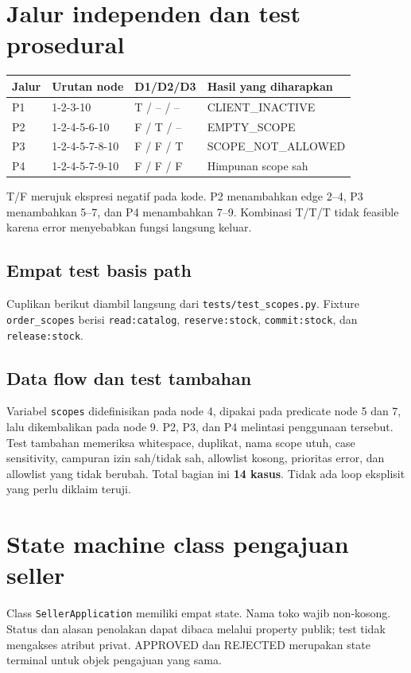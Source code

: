 \documentclass[11pt,a4paper]{article}
\begin{document}
\section{Jalur independen dan test prosedural}
\begin{tabularx}{\linewidth}{@{}l P{4cm} l Y@{}}
\toprule
Jalur & Urutan node & D1/D2/D3 & Hasil yang diharapkan\\\midrule
P1 & 1-2-3-10 & T / -- / -- & CLIENT\_INACTIVE\\
P2 & 1-2-4-5-6-10 & F / T / -- & EMPTY\_SCOPE\\
P3 & 1-2-4-5-7-8-10 & F / F / T & SCOPE\_NOT\_ALLOWED\\
P4 & 1-2-4-5-7-9-10 & F / F / F & Himpunan scope sah\\\bottomrule
\end{tabularx}

T/F merujuk ekspresi negatif pada kode. P2 menambahkan edge 2--4,
P3 menambahkan 5--7, dan P4 menambahkan 7--9. Kombinasi T/T/T tidak
feasible karena error menyebabkan fungsi langsung keluar.

\subsection{Empat test basis path}
Cuplikan berikut diambil langsung dari \texttt{tests/test\_scopes.py}.
Fixture \texttt{order\_scopes} berisi \texttt{read:catalog},
\texttt{reserve:stock}, \texttt{commit:stock}, dan \texttt{release:stock}.


\subsection{Data flow dan test tambahan}
Variabel \texttt{scopes} didefinisikan pada node 4, dipakai pada predicate
node 5 dan 7, lalu dikembalikan pada node 9. P2, P3, dan P4 melintasi
penggunaan tersebut. Test tambahan memeriksa whitespace, duplikat, nama scope
utuh, case sensitivity, campuran izin sah/tidak sah, allowlist kosong,
prioritas error, dan allowlist yang tidak berubah. Total bagian ini
\textbf{14 kasus}. Tidak ada loop eksplisit yang perlu diklaim teruji.

\newpage
\section{State machine class pengajuan seller}
Class \texttt{SellerApplication} memiliki empat state. Nama toko wajib
non-kosong. Status dan alasan penolakan dapat dibaca melalui property publik;
test tidak mengakses atribut privat. APPROVED dan REJECTED merupakan state
terminal untuk objek pengajuan yang sama.
\end{document}
